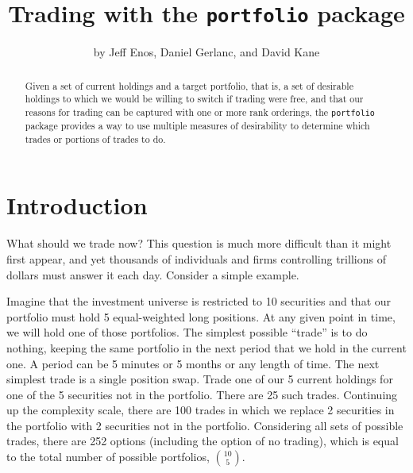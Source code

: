 \documentclass{article}
\begin{document}
\title{Trading with the \texttt{portfolio} package}
\author{by Jeff Enos, Daniel Gerlanc, and David Kane}


\maketitle


\setcounter{secnumdepth}{3}



\begin{abstract}
\label{abstract}

Given a set of current holdings and a target portfolio, that is, a set
of desirable holdings to which we would be willing to switch if
trading were free, and that our reasons for trading can be captured
with one or more rank orderings, the \texttt{portfolio} package
provides a way to use multiple measures of desirability to determine
which trades or portions of trades to do.

\end{abstract}

\section{Introduction}

What should we trade now? This question is much more difficult than it
might first appear, and yet thousands of individuals and firms
controlling trillions of dollars must answer it each day. Consider a
simple example.

Imagine that the investment universe is restricted to 10 securities
and that our portfolio must hold 5 equal-weighted long positions.  At
any given point in time, we will hold one of those portfolios. The
simplest possible ``trade'' is to do nothing, keeping the same
portfolio in the next period that we hold in the current one. A period
can be 5 minutes or 5 months or any length of time. The next simplest
trade is a single position swap. Trade one of our 5 current holdings
for one of the 5 securities not in the portfolio. There are 25 such
trades.  Continuing up the complexity scale, there are 100 trades in
which we replace 2 securities in the portfolio with 2 securities not
in the portfolio. Considering all sets of possible trades, there are
252 options (including the option of no trading), which is equal to
the total number of possible portfolios, $10 \choose 5$.
\end{document}
